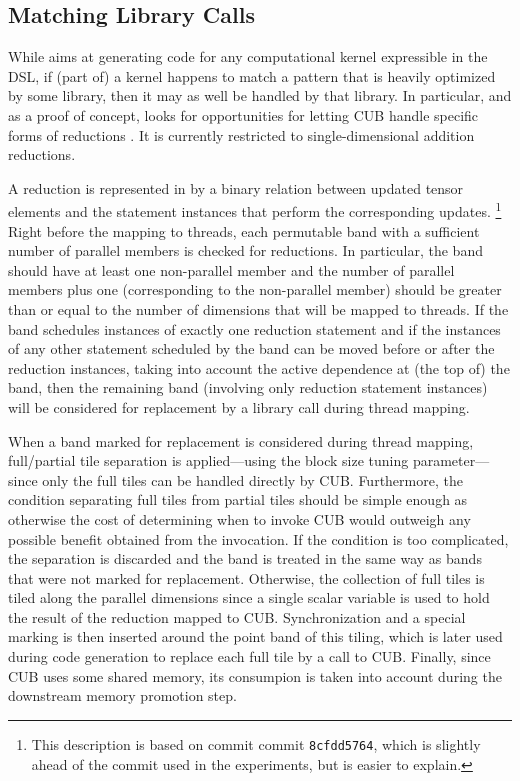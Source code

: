 \subsection{Matching Library Calls}\label{sec:matching}

While \ourtoolkitname aims at generating code for any computational kernel
expressible in the DSL, if (part of) a kernel happens to match a pattern that
is heavily optimized by some library, then it may as well
be handled by that library.
In particular, and as a proof of concept, \ourtoolkitname looks for opportunities
for letting CUB handle specific forms of reductions \cite{CUB}.
It is currently restricted to single-dimensional addition reductions.

A reduction is represented in \ourtoolkitname by a binary relation between
updated tensor elements and the statement instances that
perform the corresponding updates.%
\footnote{This description is based on commit \ourtoolkitname commit
\texttt{8cfdd5764}, which is slightly ahead of the commit used
in the experiments, but is easier to explain.}
Right before the mapping to threads, each permutable band
with a sufficient number of parallel members is checked
for reductions.  In particular, the band should have at least
one non-parallel member and the number of parallel members
plus one (corresponding to the non-parallel member)
should be greater than or equal to the number of dimensions
that will be mapped to threads.
If the band schedules instances of exactly one reduction statement and
if the instances of any other statement scheduled by the band
can be moved before or after the reduction instances,
taking into account the active dependence at (the top of)
the band, then the remaining band (involving only reduction statement
instances) will be considered for replacement by a library call
during thread mapping.

When a band marked for replacement is considered during thread mapping,
full/partial tile separation is applied---using the block size tuning
parameter---since only the full tiles can be handled directly by CUB.
Furthermore, the condition separating full tiles from partial tiles
should be simple enough as otherwise the cost of determining
when to invoke CUB would outweigh any possible benefit obtained
from the invocation.
If the condition is too complicated, the separation is discarded and
the band is treated in the same way as bands that were not marked
for replacement.
Otherwise, the collection of full tiles is tiled along the parallel
dimensions since a single scalar variable is used
to hold the result of the reduction mapped to CUB.
Synchronization and a special marking is then inserted around
the point band of this tiling, which is later used during
code generation to replace each full tile by a call to CUB.
Finally, since CUB uses some shared memory, its consumpion
is taken into account during the downstream memory promotion step.
